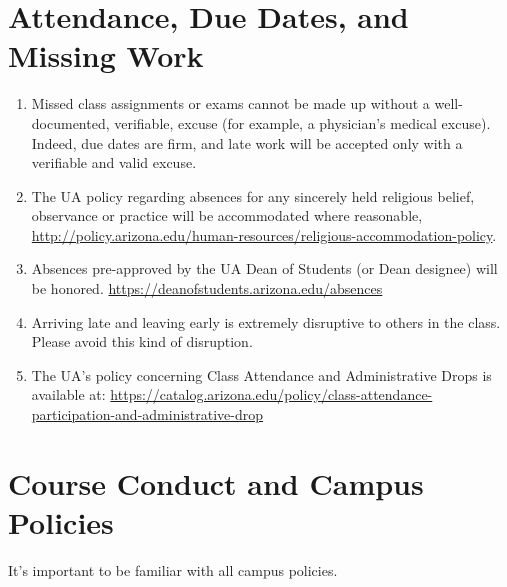 \documentclass[
]{book}
\providecommand{\tightlist}{%
  \setlength{\itemsep}{0pt}\setlength{\parskip}{0pt}}
\begin{document}
\hypertarget{attendance-due-dates-and-missing-work}{%
\section{Attendance, Due Dates, and Missing Work}\label{attendance-due-dates-and-missing-work}}

\begin{enumerate}
\def\labelenumi{\arabic{enumi}.}
\tightlist
\item
  Missed class assignments or exams cannot be made up without a well-documented, verifiable, excuse (for example, a physician's medical excuse). Indeed, due dates are firm, and late work will be accepted only with a verifiable and valid excuse.
\item
  The UA policy regarding absences for any sincerely held religious belief, observance or practice will be accommodated where reasonable, \url{http://policy.arizona.edu/human-resources/religious-accommodation-policy}.
\item
  Absences pre-approved by the UA Dean of Students (or Dean designee) will be honored. \url{https://deanofstudents.arizona.edu/absences}\\
\item
  Arriving late and leaving early is extremely disruptive to others in the class. Please avoid this kind of disruption.
\item
  The UA's policy concerning Class Attendance and Administrative Drops is available at: \url{https://catalog.arizona.edu/policy/class-attendance-participation-and-administrative-drop}
\end{enumerate}

\hypertarget{course-conduct-and-campus-policies}{%
\section{Course Conduct and Campus Policies}\label{course-conduct-and-campus-policies}}

It's important to be familiar with all campus policies.
\end{document}
